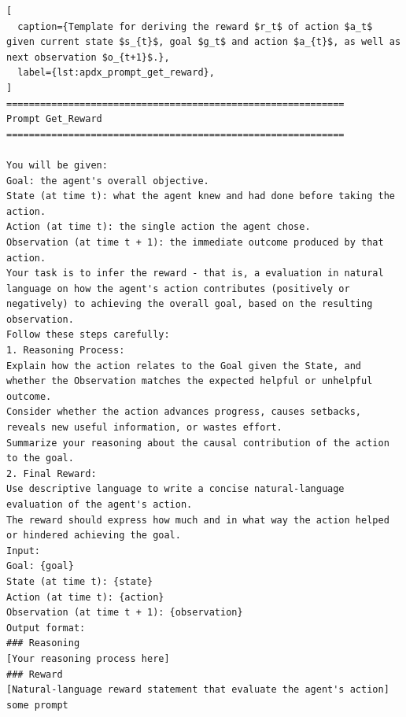\begin{lstlisting}[
  caption={Template for deriving the reward $r_t$ of action $a_t$ given current state $s_{t}$, goal $g_t$ and action $a_{t}$, as well as next observation $o_{t+1}$.},
  label={lst:apdx_prompt_get_reward},
]
============================================================
Prompt Get_Reward
============================================================

You will be given:
Goal: the agent's overall objective.
State (at time t): what the agent knew and had done before taking the action.
Action (at time t): the single action the agent chose.
Observation (at time t + 1): the immediate outcome produced by that action.
Your task is to infer the reward - that is, a evaluation in natural language on how the agent's action contributes (positively or negatively) to achieving the overall goal, based on the resulting observation.
Follow these steps carefully:
1. Reasoning Process:
Explain how the action relates to the Goal given the State, and whether the Observation matches the expected helpful or unhelpful outcome.
Consider whether the action advances progress, causes setbacks, reveals new useful information, or wastes effort.
Summarize your reasoning about the causal contribution of the action to the goal.
2. Final Reward:
Use descriptive language to write a concise natural-language evaluation of the agent's action.
The reward should express how much and in what way the action helped or hindered achieving the goal.
Input:
Goal: {goal}
State (at time t): {state}
Action (at time t): {action}
Observation (at time t + 1): {observation}
Output format:
### Reasoning
[Your reasoning process here]
### Reward
[Natural-language reward statement that evaluate the agent's action]
some prompt
\end{lstlisting}
